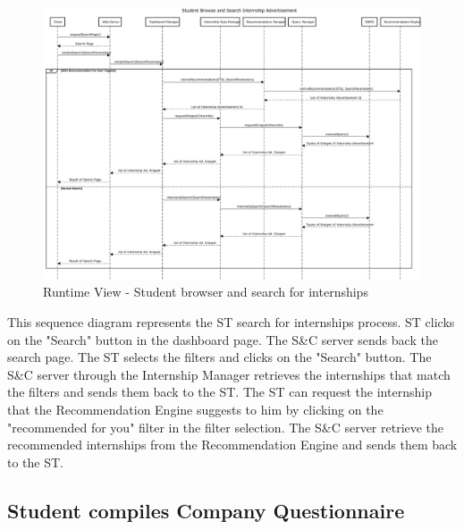 \begin{figure}[H]
      \centering
      \includegraphics[width=1.0\textwidth]{Images/RV_03.pdf}
      \caption{Runtime View - Student browser and search for internships}
      \label{fig:rv-student-browser-and-search-for-internships}
\end{figure}

\par This sequence diagram represents the ST search for internships process. ST clicks on the "Search" button in the dashboard
page. The S\&C server sends back the search page. The ST selects the filters and clicks on the "Search" button. The S\&C server
through the Internship Manager retrieves the internships that match the filters and sends them back to the ST. The ST can
request the internship that the Recommendation Engine suggests to him by clicking on the "recommended for you" filter in the 
filter selection. The S\&C server retrieve the recommended internships from the Recommendation Engine and sends them back to the ST.

\subsection{Student compiles Company Questionnaire}

